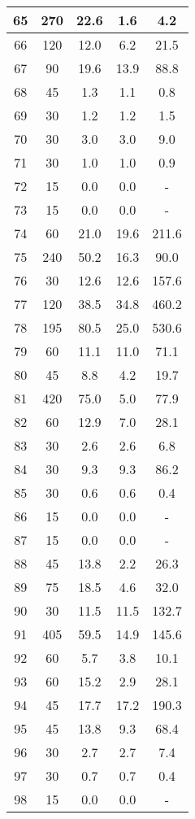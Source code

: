 \documentclass[a4paper,10pt]{article}
\begin{document}
\begin{table}
\begin{tabular}{|c|c|c|c|c|}
\hline
65 & 270 & 22.6 & 1.6 & 4.2 \\
\hline
66 & 120 & 12.0 & 6.2 & 21.5 \\
\hline
67 & 90 & 19.6 & 13.9 & 88.8 \\
\hline
68 & 45 & 1.3 & 1.1 & 0.8 \\
\hline
69 & 30 & 1.2 & 1.2 & 1.5 \\
\hline
70 & 30 & 3.0 & 3.0 & 9.0 \\
\hline
71 & 30 & 1.0 & 1.0 & 0.9 \\
\hline
72 & 15 & 0.0 & 0.0 & - \\
\hline
73 & 15 & 0.0 & 0.0 & - \\
\hline
74 & 60 & 21.0 & 19.6 & 211.6 \\
\hline
75 & 240 & 50.2 & 16.3 & 90.0 \\
\hline
76 & 30 & 12.6 & 12.6 & 157.6 \\
\hline
77 & 120 & 38.5 & 34.8 & 460.2 \\
\hline
78 & 195 & 80.5 & 25.0 & 530.6 \\
\hline
79 & 60 & 11.1 & 11.0 & 71.1 \\
\hline
80 & 45 & 8.8 & 4.2 & 19.7 \\
\hline
81 & 420 & 75.0 & 5.0 & 77.9 \\
\hline
82 & 60 & 12.9 & 7.0 & 28.1 \\
\hline
83 & 30 & 2.6 & 2.6 & 6.8 \\
\hline
84 & 30 & 9.3 & 9.3 & 86.2 \\
\hline
85 & 30 & 0.6 & 0.6 & 0.4 \\
\hline
86 & 15 & 0.0 & 0.0 & - \\
\hline
87 & 15 & 0.0 & 0.0 & - \\
\hline
88 & 45 & 13.8 & 2.2 & 26.3 \\
\hline
89 & 75 & 18.5 & 4.6 & 32.0 \\
\hline
90 & 30 & 11.5 & 11.5 & 132.7 \\
\hline
91 & 405 & 59.5 & 14.9 & 145.6 \\
\hline
92 & 60 & 5.7 & 3.8 & 10.1 \\
\hline
93 & 60 & 15.2 & 2.9 & 28.1 \\
\hline
94 & 45 & 17.7 & 17.2 & 190.3 \\
\hline
95 & 45 & 13.8 & 9.3 & 68.4 \\
\hline
96 & 30 & 2.7 & 2.7 & 7.4 \\
\hline
97 & 30 & 0.7 & 0.7 & 0.4 \\
\hline
98 & 15 & 0.0 & 0.0 & - \\

\end{tabular}
\end{table}
\end{document}

